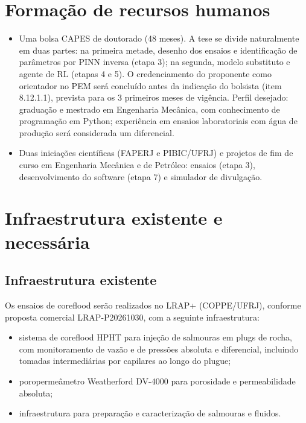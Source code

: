 \documentclass[10pt,a4paper]{article}
\newcommand{\itemedital}[1]{}
\begin{document}
\section{Formação de recursos humanos}\itemedital{2.16 XVIII; critério 3}
\begin{itemize}
  \item Uma bolsa CAPES de doutorado (48 meses). A tese se divide naturalmente em duas
        partes: na primeira metade, desenho dos ensaios e identificação de parâmetros por
        PINN inversa (etapa 3); na segunda, modelo substituto e agente de RL (etapas 4 e 5).
        O credenciamento do proponente como orientador no PEM será concluído antes da indicação do
        bolsista (item 8.12.1.1), prevista para os 3 primeiros meses de vigência.
        Perfil desejado: graduação e mestrado em Engenharia Mecânica, com conhecimento de
        programação em Python; experiência em ensaios laboratoriais com água de produção
        será considerada um diferencial.
  \item Duas iniciações científicas (FAPERJ e PIBIC/UFRJ) e projetos de fim de curso em
        Engenharia Mecânica e de Petróleo: ensaios (etapa 3), desenvolvimento do software
        (etapa 7) e simulador de divulgação.
\end{itemize}

\section{Infraestrutura existente e necessária}\label{sec:infra}\itemedital{2.16 XIX; Anexo 1 G, II.II-h}

\subsection{Infraestrutura existente}
Os ensaios de coreflood serão realizados no LRAP+ (COPPE/UFRJ), conforme proposta comercial LRAP-P20261030, com a seguinte infraestrutura:
\begin{itemize}
  \item sistema de coreflood HPHT para injeção de salmouras em plugs de rocha, com
        monitoramento de vazão e de pressões absoluta e diferencial, incluindo tomadas
        intermediárias por capilares ao longo do plugue;
  \item poropermeâmetro Weatherford DV-4000 para porosidade e permeabilidade absoluta;
  \item infraestrutura para preparação e caracterização de salmouras e fluidos.
\end{itemize}
\end{document}
